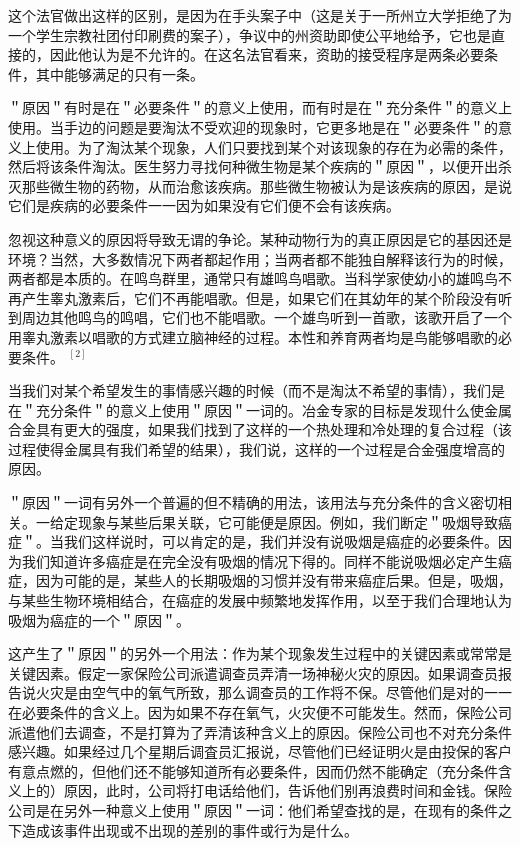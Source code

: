 这个法官做出这样的区别，是因为在手头案子中（这是关于一所州立大学拒绝了为一个学生宗教社团付印刷费的案子），争议中的州资助即使公平地给予，它也是直接的，因此他认为是不允许的。在这名法官看来，资助的接受程序是两条必要条件，其中能够满足的只有一条。

＂原因＂有时是在＂必要条件＂的意义上使用，而有时是在＂充分条件＂的意义上使用。当手边的问题是要淘汰不受欢迎的现象时，它更多地是在＂必要条件＂的意义上使用。为了淘汰某个现象，人们只要找到某个对该现象的存在为必需的条件，然后将该条件淘汰。医生努力寻找何种微生物是某个疾病的＂原因＂，以便开出杀灭那些微生物的药物，从而治愈该疾病。那些微生物被认为是该疾病的原因，是说它们是疾病的必要条件一一因为如果没有它们便不会有该疾病。

忽视这种意义的原因将导致无谓的争论。某种动物行为的真正原因是它的基因还是环境？当然，大多数情况下两者都起作用；当两者都不能独自解释该行为的时候，两者都是本质的。在鸣鸟群里，通常只有雄鸣鸟唱歌。当科学家使幼小的雄鸣鸟不再产生睾丸激素后，它们不再能唱歌。但是，如果它们在其幼年的某个阶段没有听到周边其他鸣鸟的鸣唱，它们也不能唱歌。一个雄鸟听到一首歌，该歌开启了一个用睾丸激素以唱歌的方式建立脑神经的过程。本性和养育两者均是鸟能够唱歌的必要条件。 ${ }^{[2]}$

当我们对某个希望发生的事情感兴趣的时候（而不是淘汰不希望的事情），我们是在＂充分条件＂的意义上使用＂原因＂一词的。冶金专家的目标是发现什么使金属合金具有更大的强度，如果我们找到了这样的一个热处理和冷处理的复合过程（该过程使得金属具有我们希望的结果），我们说，这样的一个过程是合金强度增高的原因。

＂原因＂一词有另外一个普遍的但不精确的用法，该用法与充分条件的含义密切相关。一给定现象与某些后果关联，它可能便是原因。例如，我们断定＂吸烟导致癌症＂。当我们这样说时，可以肯定的是，我们并没有说吸烟是癌症的必要条件。因为我们知道许多癌症是在完全没有吸烟的情况下得的。同样不能说吸烟必定产生癌症，因为可能的是，某些人的长期吸烟的习惯并没有带来癌症后果。但是，吸烟，与某些生物环境相结合，在癌症的发展中频繁地发挥作用，以至于我们合理地认为吸烟为癌症的一个＂原因＂。

这产生了＂原因＂的另外一个用法：作为某个现象发生过程中的关键因素或常常是关键因素。假定一家保险公司派遣调查员弄清一场神秘火灾的原因。如果调查员报告说火灾是由空气中的氧气所致，那么调查员的工作将不保。尽管他们是对的一一在必要条件的含义上。因为如果不存在氧气，火灾便不可能发生。然而，保险公司派遣他们去调查，不是打算为了弄清该种含义上的原因。保险公司也不对充分条件感兴趣。如果经过几个星期后调査员汇报说，尽管他们已经证明火是由投保的客户有意点燃的，但他们还不能够知道所有必要条件，因而仍然不能确定（充分条件含义上的）原因，此时，公司将打电话给他们，告诉他们别再浪费时间和金钱。保险公司是在另外一种意义上使用＂原因＂一词：他们希望查找的是，在现有的条件之下造成该事件出现或不出现的差别的事件或行为是什么。

